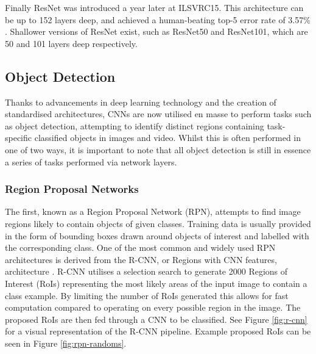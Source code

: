 Finally ResNet was introduced a year later at ILSVRC15. This architecture can be up to 152 layers deep, and achieved a human-beating top-5 error rate of 3.57\% \cite{he_deep_2015}. Shallower versions of ResNet exist, such as ResNet50 and ResNet101, which are 50 and 101 layers deep respectively.

\subsection{Object Detection}\label{ch:Background,sec:objectDetection}

Thanks to advancements in deep learning technology and the creation of standardised architectures, CNNs are now utilised en masse to perform tasks such as object detection, attempting to identify distinct regions containing task-specific classified objects in images and video. Whilst this is often performed in one of two ways, it is important to note that all object detection is still in essence a series of tasks performed via network layers. 

\subsubsection{Region Proposal Networks}\label{ch:Background,sec:objectDetection,sub:RPN}

The first, known as a Region Proposal Network (RPN), attempts to find image regions likely to contain objects of given classes. Training data is usually provided in the form of bounding boxes drawn around objects of interest and labelled with the corresponding class. One of the most common and widely used RPN architectures is derived from the R-CNN, or Regions with CNN features, architecture \cite{girshick_rich_2014}. R-CNN utilises a selection search \cite{uijlings_selective_2013} to generate 2000 Regions of Interest (RoIs) representing the most likely areas of the input image to contain a class example. By limiting the number of RoIs generated this allows for fast computation compared to operating on every possible region in the image. The proposed RoIs are then fed through a CNN to be classified. See Figure \ref{fig:r-cnn} for a visual representation of the R-CNN pipeline. Example proposed RoIs can be seen in Figure \ref{fig:rpn-randoms}.

